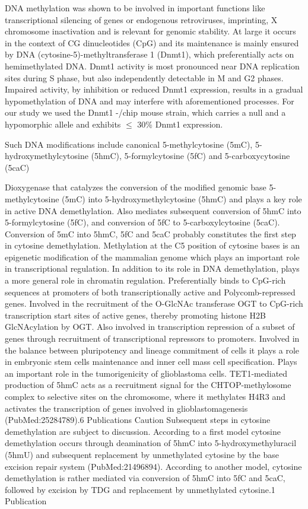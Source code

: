 DNA methylation was shown to be involved in important functions like transcriptional silencing of genes or endogenous retroviruses, imprinting, X chromosome inactivation and is relevant for genomic stability\cite{Goll2005}. At large it occurs in the context of CG dinucleotides (CpG) and its maintenance is mainly ensured by DNA (cytosine-5)-methyltransferase 1 (Dnmt1), which preferentially acts on hemimethylated DNA. Dnmt1 activity is most pronounced near DNA replication sites during S phase, but also independently detectable in M and G2 phases. Impaired activity, by inhibition or reduced Dnmt1 expression, results in a gradual hypomethylation of DNA and may interfere with aforementioned processes. For our study we used the Dnmt1 -/chip mouse strain\cite{Gaudet2003}, which carries a null\cite{Lei1996} and a hypomorphic\cite{Tucker1996} allele and exhibits $\leq$ 30\% Dnmt1 expression. 

Such DNA modifications include canonical 5-methylcytosine (5mC), 5-hydroxymethylcytosine (5hmC), 5-formylcytosine (5fC) and 5-carboxycytosine (5caC)\cite{Plongthongkum2014}

Dioxygenase that catalyzes the conversion of the modified genomic base 5-methylcytosine (5mC) into 5-hydroxymethylcytosine (5hmC) and plays a key role in active DNA demethylation. Also mediates subsequent conversion of 5hmC into 5-formylcytosine (5fC), and conversion of 5fC to 5-carboxylcytosine (5caC). Conversion of 5mC into 5hmC, 5fC and 5caC probably constitutes the first step in cytosine demethylation. Methylation at the C5 position of cytosine bases is an epigenetic modification of the mammalian genome which plays an important role in transcriptional regulation. In addition to its role in DNA demethylation, plays a more general role in chromatin regulation. Preferentially binds to CpG-rich sequences at promoters of both transcriptionally active and Polycomb-repressed genes. Involved in the recruitment of the O-GlcNAc transferase OGT to CpG-rich transcription start sites of active genes, thereby promoting histone H2B GlcNAcylation by OGT. Also involved in transcription repression of a subset of genes through recruitment of transcriptional repressors to promoters. Involved in the balance between pluripotency and lineage commitment of cells it plays a role in embryonic stem cells maintenance and inner cell mass cell specification. Plays an important role in the tumorigenicity of glioblastoma cells. TET1-mediated production of 5hmC acts as a recruitment signal for the CHTOP-methylosome complex to selective sites on the chromosome, where it methylates H4R3 and activates the transcription of genes involved in glioblastomagenesis (PubMed:25284789).6 Publications
Caution
Subsequent steps in cytosine demethylation are subject to discussion. According to a first model cytosine demethylation occurs through deamination of 5hmC into 5-hydroxymethyluracil (5hmU) and subsequent replacement by unmethylated cytosine by the base excision repair system (PubMed:21496894). According to another model, cytosine demethylation is rather mediated via conversion of 5hmC into 5fC and 5caC, followed by excision by TDG and replacement by unmethylated cytosine.1 Publication

